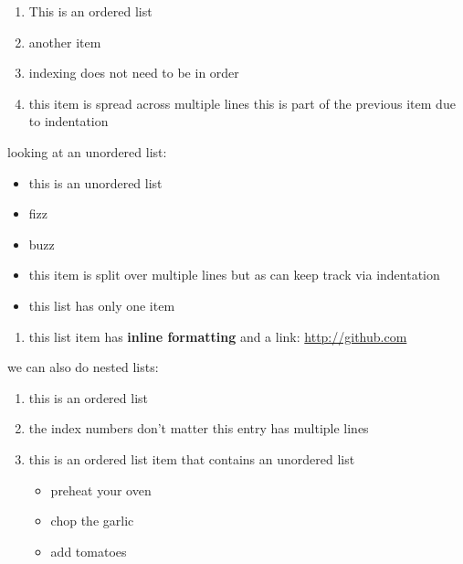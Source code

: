 
\begin{enumerate}
    \item This is an ordered list
    \item another item
    \item indexing does not need to be in order
    \item this item is spread across multiple lines
        this is part of the previous item due to indentation
\end{enumerate}

looking at an unordered list:

\begin{itemize}
    \item this is an unordered list
    \item fizz
    \item buzz
    \item this item is split over multiple lines
        but as can keep track via indentation
\end{itemize}

\begin{itemize}
    \item this list has only one item
\end{itemize}

\begin{enumerate}
    \item this list item has \textbf{inline formatting} and a link: \url{http://github.com}
\end{enumerate}

we can also do nested lists:

\begin{enumerate}
    \item this is an ordered list

    \item the index numbers don't matter
    this entry has multiple lines

    \item this is an ordered list item that contains an unordered list
    \begin{itemize}
        \item preheat your oven
        \item chop the garlic
        \item add tomatoes
    \end{itemize}

\end{enumerate}